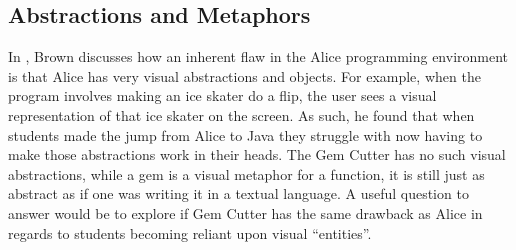 \subsection{Abstractions and Metaphors}

In \cite{brown08}, Brown discusses how an inherent flaw in the Alice programming environment is that Alice has very visual abstractions and objects.  For example, when the program involves making an ice skater do a flip, the user sees a visual representation of that ice skater on the screen.  As such, he found that when students made the jump from Alice to Java they struggle with now having to make those abstractions work in their heads.  The Gem Cutter has no such visual abstractions, while a gem is a visual metaphor for a function, it is still just as abstract as if one was writing it in a textual language.  A useful question to answer would be to explore if Gem Cutter has the same drawback as Alice in regards to students becoming reliant upon visual ``entities''.